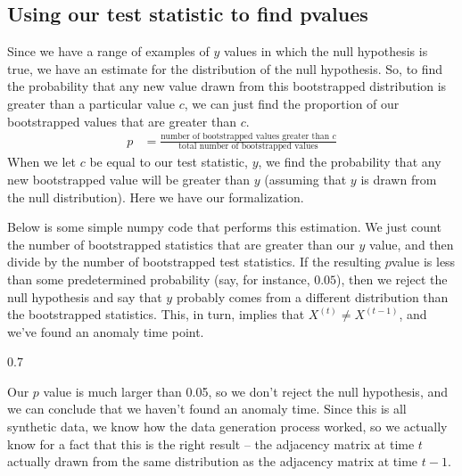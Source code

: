 \documentclass[letterpaper,10pt,english]{jupyterBook}
\begin{document}
\subsection{Using our test statistic to find p\sphinxhyphen{}values}
\label{\detokenize{applications/ch10/anomaly-detection:using-our-test-statistic-to-find-p-values}}
\sphinxAtStartPar
Since we have a range of examples of \(y\) values in which the null hypothesis is true, we have an estimate for the distribution of the null hypothesis. So, to find the probability that any new value drawn from this bootstrapped distribution is greater than a particular value \(c\), we can just find the proportion of our bootstrapped values that are greater than \(c\).
\begin{align*}
    p &= \frac{\textrm{number of bootstrapped values greater than $c$}}{\textrm{total number of bootstrapped values}}
\end{align*}
\sphinxAtStartPar
When we let \(c\) be equal to our test statistic, \(y\), we find the probability that any new bootstrapped value will be greater than \(y\) (assuming that \(y\) is drawn from the null distribution). Here we have our formalization.

\sphinxAtStartPar
Below is some simple numpy code that performs this estimation. We just count the number of bootstrapped statistics that are greater than our \(y\) value, and then divide by the number of bootstrapped test statistics. If the resulting \(p\)\sphinxhyphen{}value is less than some pre\sphinxhyphen{}determined probability (say, for instance, \(0.05\)), then we reject the null hypothesis and say that \(y\) probably comes from a different distribution than the bootstrapped statistics. This, in turn, implies that \(X^{(t)} \neq X^{(t-1)}\), and we’ve found an anomaly time point.

\begin{sphinxVerbatim}[commandchars=\\\{\}]
      

\end{sphinxVerbatim}

\begin{sphinxVerbatim}[commandchars=\\\{\}]
0.7
\end{sphinxVerbatim}

\sphinxAtStartPar
Our \(p\) value is much larger than 0.05, so we don’t reject the null hypothesis, and we can conclude that we haven’t found an anomaly time. Since this is all synthetic data, we know how the data generation process worked, so we actually know for a fact that this is the right result – the adjacency matrix at time \(t\) actually  drawn from the same distribution as the adjacency matrix at time \(t-1\).
\end{document}
